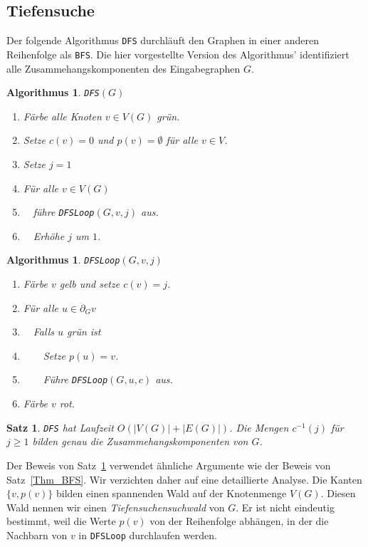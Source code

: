 \documentclass[10pt,reqno]{amsart}
\numberwithin{equation}{section}
\newtheorem{theorem}[definition]{Satz}
\newtheorem{algorithm}[definition]{Algorithmus}
\newcommand\Thm{Satz}
\begin{document}
\subsection{Tiefensuche}\label{sec_dfs}
Der folgende Algorithmus {\tt DFS} durchl\"auft den Graphen in einer anderen Reihenfolge als {\tt BFS}.
Die hier vorgestellte Version des Algorithmus' identifiziert alle Zusammehangskomponenten des Eingabegraphen $G$.

\begin{algorithm}{\tt DFS}$(G)$
	\begin{enumerate}
		\item F\"arbe alle Knoten $v\in V(G)$ gr\"un.
		\item Setze $c(v)=0$ und $p(v)=\emptyset$ f\"ur alle $v\in V$.
		\item Setze $j=1$
		\item F\"ur alle $v\in V(G)$
		\item $\quad$f\"uhre {\tt DFSLoop}$(G,v,j)$ aus.
		\item $\quad$Erh\"ohe $j$ um $1$.
	\end{enumerate}
\end{algorithm}

\begin{algorithm}{\tt DFSLoop}$(G,v,j)$
	\begin{enumerate}
		\item F\"arbe $v$ gelb und setze $c(v)=j$.
		\item F\"ur alle $u\in\partial_Gv$
		\item $\quad$Falls $u$ gr\"un ist
		\item $\quad\quad$Setze $p(u)=v$.
		\item $\quad\quad$F\"uhre {\tt DFSLoop}$(G,u,c)$ aus.
		\item F\"arbe $v$ rot.
	\end{enumerate}
\end{algorithm}

\begin{theorem}\label{thm_dfs}
	{\tt DFS} hat Laufzeit $O(|V(G)|+|E(G)|)$.
	Die Mengen $c^{-1}(j)$ f\"ur $j\geq1$ bilden genau die Zusammehangskomponenten von $G$.
\end{theorem}

Der Beweis von \Thm~\ref{thm_dfs} verwendet \"ahnliche Argumente wie der Beweis von \Thm~\ref{Thm_BFS}.
Wir verzichten daher auf eine detaillierte Analyse.
Die Kanten $\{v,p(v)\}$ bilden einen spannenden Wald auf der Knotenmenge $V(G)$.
Diesen Wald nennen wir einen {\em Tiefensuchensuchwald} von $G$.
Er ist nicht eindeutig bestimmt, weil die Werte $p(v)$ von der Reihenfolge abh\"angen, in der die Nachbarn von $v$ in {\tt DFSLoop} durchlaufen werden.
\end{document}
